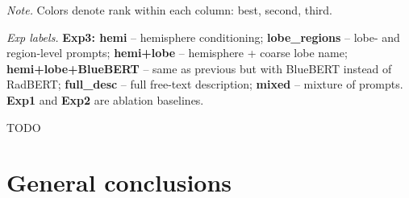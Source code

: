 \documentclass[a4paper,12pt]{article}
\begin{document}
\begin{table}[ht]
\begin{threeparttable}
\begin{tabular}{lccccccc}
\bottomrule
\end{tabular}

\begin{tablenotes}[flushleft]
\footnotesize
\item \textit{Note.} Colors denote rank within each column:
\colorbox{green!20}{best}, \colorbox{blue!20}{second}, \colorbox{orange!20}{third}.
\item \textit{Exp labels.} \textbf{Exp3: hemi} -- hemisphere conditioning; 
\textbf{lobe\_regions} -- lobe- and region-level prompts; 
\textbf{hemi+lobe} -- hemisphere + coarse lobe name; 
\textbf{hemi+lobe+BlueBERT} -- same as previous but with BlueBERT instead of RadBERT; 
\textbf{full\_desc} -- full free-text description; 
\textbf{mixed} -- mixture of prompts. 
\textbf{Exp1} and \textbf{Exp2} are ablation baselines.
\end{tablenotes}
\end{threeparttable}

\end{table}

TODO

\section*{General conclusions}
\end{document}

